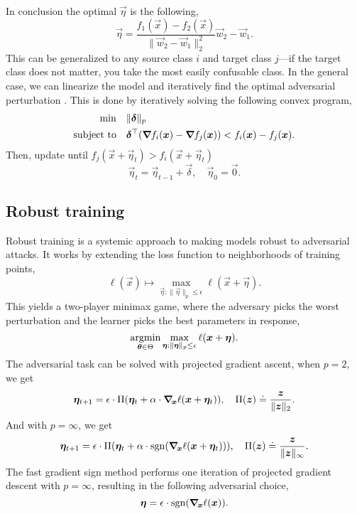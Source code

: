 In conclusion the optimal $\vec{\eta}$ is the following, \[
    \vec{\eta} = \frac{f_1(\vec{x}) - f_2(\vec{x})}{\| \vec{w}_2 - \vec{w}_1 \|^2_2} \vec{w}_2 - \vec{w}_1.
\]
This can be generalized to any source class $i$ and target class $j$---if the target class does not
matter, you take the most easily confusable class. In the general case, we can linearize the model
and iteratively find the optimal adversarial perturbation \citep{moosavi2016deepfool}. This is done
by iteratively solving the following convex program,
\begin{align*}
    \min              & \quad \| \vec{\delta} \|_p                                                                                              \\
    \text{subject to} & \quad \transpose{\vec{\delta}} \lft( \grad{f_i(\vec{x})}{} - \grad{f_j(\vec{x})}{} \rgt) < f_i(\vec{x}) - f_j(\vec{x}).
\end{align*}
Then, update until $f_j(\vec{x} + \vec{\eta}_t) > f_i(\vec{x} + \vec{\eta}_t)$ \[
    \vec{\eta}_t = \vec{\eta}_{t-1} + \vec{\delta}, \quad \vec{\eta}_0 = \vec{0}.
\]

\subsection{Robust training}

Robust training is a systemic approach to making models robust to adversarial attacks. It works by
extending the loss function to neighborhoods of training points, \[
    \ell(\vec{x}) \mapsto \max_{\vec{\eta} : \| \vec{\eta} \|_p \leq \epsilon} \ell(\vec{x} + \vec{\eta}).
\]
This yields a two-player minimax game, where the adversary picks the worst perturbation and the
learner picks the best parameters in response, \[
    \operatorname*{argmin}_{\bm{\theta} \in \Theta} \max_{\bm{\eta} : \| \bm{\eta} \|_p \leq \epsilon} \ell(\bm{x} + \bm{\eta}).
\]
The adversarial task can be solved with projected gradient ascent, \eg when $p=2$, we get \[
    \vec{\eta}_{t+1} = \epsilon \cdot \Pi \lft( \vec{\eta}_t + \alpha \cdot \grad{\ell(\vec{x} + \vec{\eta}_t)}{\vec{x}} \rgt), \quad \Pi(\vec{z}) \doteq \frac{\vec{z}}{\| \vec{z} \|_2}.
\]
And with $p=\infty$, we get \[
    \vec{\eta}_{t+1} = \epsilon \cdot \Pi \lft( \vec{\eta}_t + \alpha \cdot \mathrm{sgn} \lft( \grad{\ell(\vec{x} + \vec{\eta}_t)}{\vec{x}} \rgt) \rgt), \quad \Pi(\vec{z}) \doteq \frac{\vec{z}}{\| \vec{z} \|_\infty}.
\]
The fast gradient sign method \citep{goodfellow2014explaining} performs one iteration of projected
gradient descent with $p=\infty$, resulting in the following adversarial choice, \[
    \vec{\eta} = \epsilon \cdot \mathrm{sgn} \lft( \grad{\ell(\vec{x})}{\vec{x}} \rgt).
\]
